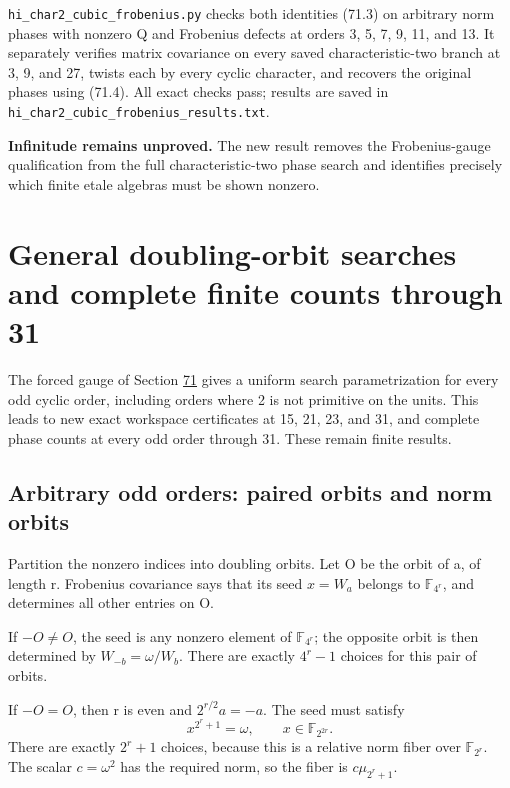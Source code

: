 \documentclass[11pt,reqno]{amsart}
\theoremstyle{plain}
\begin{document}
\texttt{hi\_\allowbreak char2\_\allowbreak cubic\_\allowbreak frobenius.py} checks both identities (71.3) on
arbitrary norm phases with nonzero Q and Frobenius defects at
orders 3, 5, 7, 9, 11, and 13. It separately verifies matrix
covariance on every saved characteristic-two branch at 3, 9, and
27, twists each by every cyclic character, and recovers the
original phases using (71.4). All exact checks pass; results are
saved in \texttt{hi\_\allowbreak char2\_\allowbreak cubic\_\allowbreak frobenius\_\allowbreak results.txt}.

\textbf{Infinitude remains unproved.} The new result removes the
Frobenius-gauge qualification from the full characteristic-two
phase search and identifies precisely which finite etale algebras
must be shown nonzero.

\section{General doubling-orbit searches and complete finite counts through 31}\label{sec:72}

The forced gauge of Section \hyperref[sec:71]{71} gives a uniform search parametrization
for every odd cyclic order, including orders where 2 is not primitive
on the units. This leads to new exact workspace certificates at
15, 21, 23, and 31, and complete phase counts at every odd order
through 31. These remain finite results.

\subsection{Arbitrary odd orders: paired orbits and norm orbits}\label{sec:72.1}

Partition the nonzero indices into doubling orbits. Let O be the
orbit of a, of length r. Frobenius covariance says that its seed
\(x=W_a\) belongs to \(\mathbb F_{4^r}\), and determines all
other entries on O.

If \(-O\ne O\), the seed is any nonzero element of
\(\mathbb F_{4^r}\); the opposite orbit is then determined by
\(W_{-b}=\omega/W_b\). There are exactly \(4^r-1\) choices
for this pair of orbits.

If \(-O=O\), then r is even and \(2^{r/2}a=-a\). The seed
must satisfy
\begin{equation*}
 x^{2^r+1}=\omega,\qquad x\in\mathbb F_{2^{2r}}.
 \tag{72.1}
\end{equation*}
There are exactly \(2^r+1\) choices, because this is a relative
norm fiber over \(\mathbb F_{2^r}\). The scalar
\(c=\omega^2\) has the required norm, so the fiber is
\(c\mu_{2^r+1}\).
\end{document}
